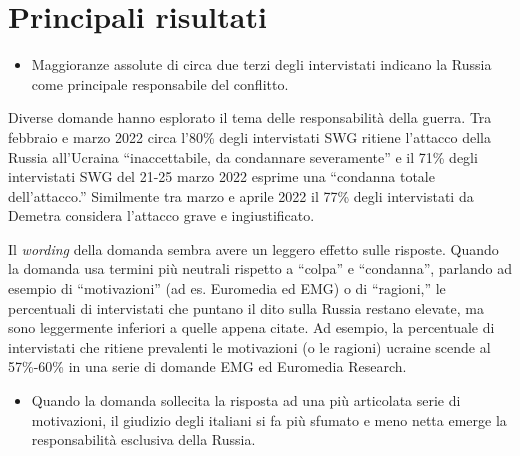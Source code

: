 \documentclass[
]{book}
\providecommand{\tightlist}{%
  \setlength{\itemsep}{0pt}\setlength{\parskip}{0pt}}
\begin{document}
\hypertarget{principali-risultati-1}{%
\section{Principali risultati}\label{principali-risultati-1}}

\begin{itemize}
\tightlist
\item
  Maggioranze assolute di circa due terzi degli intervistati indicano la Russia come principale responsabile del conflitto.
\end{itemize}

Diverse domande hanno esplorato il tema delle responsabilità della guerra. Tra febbraio e marzo 2022 circa l'80\% degli intervistati SWG ritiene l'attacco della Russia all'Ucraina ``inaccettabile, da condannare severamente'' e il 71\% degli intervistati SWG del 21-25 marzo 2022 esprime una ``condanna totale dell'attacco.'' Similmente tra marzo e aprile 2022 il 77\% degli intervistati da Demetra considera l'attacco grave e ingiustificato.

Il \emph{wording} della domanda sembra avere un leggero effetto sulle risposte. Quando la domanda usa termini più neutrali rispetto a ``colpa'' e ``condanna'', parlando ad esempio di ``motivazioni'' (ad es. Euromedia ed EMG) o di ``ragioni,'' le percentuali di intervistati che puntano il dito sulla Russia restano elevate, ma sono leggermente inferiori a quelle appena citate. Ad esempio, la percentuale di intervistati che ritiene prevalenti le motivazioni (o le ragioni) ucraine scende al 57\%-60\% in una serie di domande EMG ed Euromedia Research.

\begin{itemize}
\tightlist
\item
  Quando la domanda sollecita la risposta ad una più articolata serie di motivazioni, il giudizio degli italiani si fa più sfumato e meno netta emerge la responsabilità esclusiva della Russia.
\end{itemize}
\end{document}
